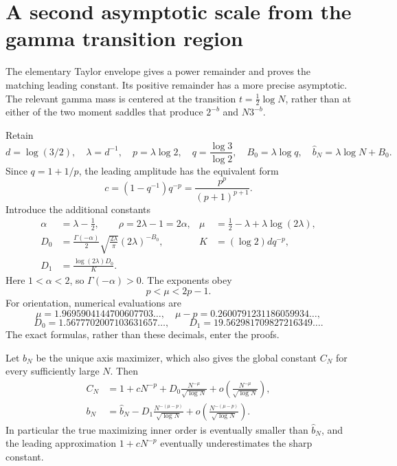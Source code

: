 
\section{A second asymptotic scale from the gamma transition region}
\label{eul:sec:second-scale}
The elementary Taylor envelope gives a power remainder and proves the
matching leading constant.  Its positive remainder has a more precise
asymptotic.  The relevant gamma mass is centered at the transition
$t=\tfrac12\log N$, rather than at either of the two moment saddles
that produce $2^{-b}$ and $N3^{-b}$.

Retain
\[
 d=\log(3/2),\quad \lambda=d^{-1},\quad p=\lambda\log2,
 \quad q=\frac{\log3}{\log2},\quad
 B_0=\lambda\log q,\quad
 \widehat b_N=\lambda\log N+B_0.
\]
Since $q=1+1/p$, the leading amplitude has the equivalent form
\begin{equation}\label{eul:eq:c-simplified}
 c=(1-q^{-1})q^{-p}=\frac{p^p}{(p+1)^{p+1}}.
\end{equation}
Introduce the additional constants
\begin{align}
 \alpha&=\lambda-\tfrac12,\qquad \rho=2\lambda-1=2\alpha,
 &\mu&=\tfrac12-\lambda+\lambda\log(2\lambda),\label{eul:eq:mu}\\
 D_0&=\frac{\Gamma(-\alpha)}2
       \sqrt{\frac{2\lambda}{\pi}}(2\lambda)^{-B_0},
 &K&=(\log2)dq^{-p},\label{eul:eq:second-amplitudes}\\
 D_1&=\frac{\log(2\lambda)D_0}{K}.
 \nonumber
\end{align}
Here $1<\alpha<2$, so $\Gamma(-\alpha)>0$.
The exponents obey
\begin{equation}\label{eul:eq:exponent-order}
 p<\mu<2p-1.
\end{equation}
For orientation, numerical evaluations are
\[
 \mu=1.9695904144700607703\ldots,\quad
 \mu-p=0.2600791231186059934\ldots,
\]
\[
 D_0=1.5677702007103631657\ldots,\qquad
 D_1=19.562981709827216349\ldots.
\]
The exact formulas, rather than these decimals, enter the proofs.

\begin{theorem}
\label{eul:thm:second-term}
Let $b_N$ be the unique axis maximizer, which also gives the global
constant $C_N$ for every sufficiently large $N$.  Then
\begin{align}
 C_N&=1+cN^{-p}
       +D_0\frac{N^{-\mu}}{\sqrt{\log N}}
       +o\!\left(\frac{N^{-\mu}}{\sqrt{\log N}}\right),
       \label{eul:eq:CN-second}\\
 b_N&=\widehat b_N
       -D_1\frac{N^{-(\mu-p)}}{\sqrt{\log N}}
       +o\!\left(\frac{N^{-(\mu-p)}}{\sqrt{\log N}}\right).
       \label{eul:eq:bN-second}
\end{align}
In particular the true maximizing inner order is eventually smaller
than $\widehat b_N$, and the leading approximation
$1+cN^{-p}$ eventually underestimates the sharp constant.
\end{theorem}

